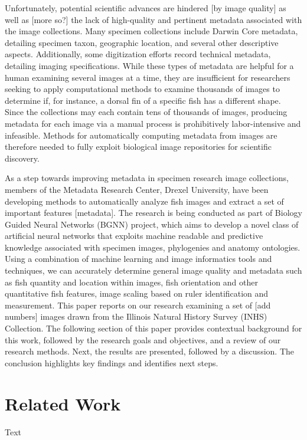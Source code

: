 \documentclass[screen,review]{acmart}
\begin{document}
Unfortunately, potential scientific advances are hindered [by image quality] as well as [more so?] the lack of high-quality and pertinent metadata associated with the image collections. Many specimen collections include Darwin Core metadata, detailing specimen taxon, geographic location, and several other descriptive aspects. Additionally, some digitization efforts record technical metadata, detailing imaging specifications. While these types of metadata are helpful for a human examining several images at a time, they are insufficient for researchers seeking to apply computational methods to examine thousands of images to determine if, for instance, a dorsal fin of a specific fish has a different shape. Since the collections may each contain tens of thousands of images, producing metadata for each image via a manual process is prohibitively labor-intensive and infeasible. Methods for automatically computing metadata from images are therefore needed to fully exploit biological image repositories for scientific discovery.~\cite{Leipzig2021.01.28.428644}

As a step towards improving metadata in specimen research image collections, members of the Metadata Research Center, Drexel University, have been developing methods to automatically analyze fish images and extract a set of important features [metadata]. The research is being conducted as part of Biology Guided Neural Networks (BGNN) project, which aims to develop a novel class of artificial neural networks that exploits machine readable and predictive knowledge associated with specimen images, phylogenies and anatomy ontologies. Using a combination of machine learning and image informatics tools and techniques, we can accurately determine general image quality and metadata such as fish quantity and location within images, fish orientation and other quantitative fish features, image scaling based on ruler identification and measurement. This paper reports on our research examining a set of [add numbers] images drawn from the Illinois Natural History Survey (INHS) Collection. The following section of this paper provides contextual background for this work, followed by the research goals and objectives, and a review of our research methods. Next, the results are presented, followed by a discussion. The conclusion highlights key findings and identifies next steps.

\section{Related Work}
Text~
\end{document}
